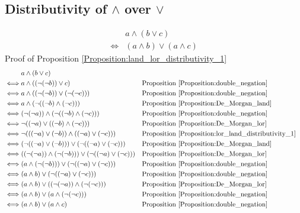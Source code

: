 \subsection{Distributivity of $\land$ over $\lor$}
\begin{prop}
\label{Proposition:land_lor_distributivity_1}
\begin{align*}
& a \land (b \lor c) \\
\iff & (a \land b) \lor (a \land c)
\end{align*}
Proof of Proposition \ref{Proposition:land_lor_distributivity_1}
\begin{align*}
& a \land (b \lor c) \\
\iff & a \land ((\lnot (\lnot b)) \lor c)
& & \text{Proposition \ref{Proposition:double_negation}} \\
\iff & a \land ((\lnot (\lnot b)) \lor (\lnot (\lnot c)))
& & \text{Proposition \ref{Proposition:double_negation}} \\
\iff & a \land (\lnot ((\lnot b) \land (\lnot c)))
& & \text{Proposition \ref{Proposition:De_Morgan_land}} \\
\iff & (\lnot (\lnot a)) \land (\lnot ((\lnot b) \land (\lnot c)))
& & \text{Proposition \ref{Proposition:double_negation}} \\
\iff & \lnot ((\lnot a) \lor ((\lnot b) \land (\lnot c)))
& & \text{Proposition \ref{Proposition:De_Morgan_lor}} \\
\iff & \lnot (((\lnot a) \lor (\lnot b)) \land ((\lnot a) \lor (\lnot c)))
& & \text{Proposition \ref{Proposition:lor_land_distributivity_1}} \\
\iff & (\lnot ((\lnot a) \lor (\lnot b))) \lor (\lnot ((\lnot a) \lor (\lnot c)))
& & \text{Proposition \ref{Proposition:De_Morgan_land}} \\
\iff & ((\lnot (\lnot a)) \land (\lnot (\lnot b))) \lor (\lnot ((\lnot a) \lor (\lnot c)))
& & \text{Proposition \ref{Proposition:De_Morgan_lor}} \\
\iff & (a \land (\lnot (\lnot b))) \lor (\lnot ((\lnot a) \lor (\lnot c)))
& & \text{Proposition \ref{Proposition:double_negation}} \\
\iff & (a \land b) \lor (\lnot ((\lnot a) \lor (\lnot c)))
& & \text{Proposition \ref{Proposition:double_negation}} \\
\iff & (a \land b) \lor ((\lnot (\lnot a)) \land (\lnot (\lnot c)))
& & \text{Proposition \ref{Proposition:De_Morgan_lor}} \\
\iff & (a \land b) \lor (a \land (\lnot (\lnot c)))
& & \text{Proposition \ref{Proposition:double_negation}} \\
\iff & (a \land b) \lor (a \land c)
& & \text{Proposition \ref{Proposition:double_negation}} \\
\end{align*}
\end{prop}

